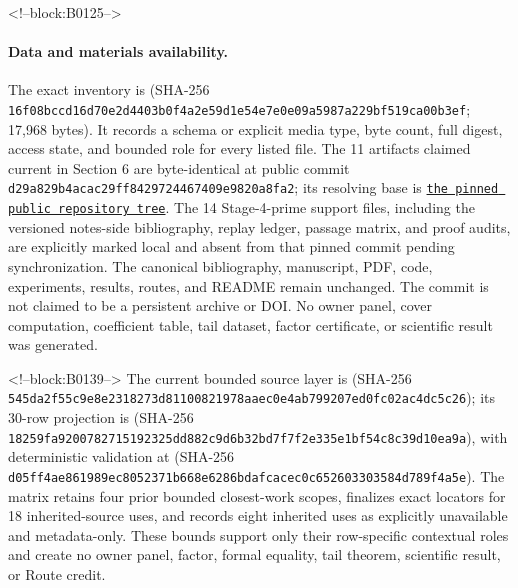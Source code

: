 \documentclass[11pt]{article}
\begin{document}
<!--block:B0125-->
\paragraph{Data and materials availability.}\begingroup\sloppy
The exact inventory is
 (SHA-256
\texttt{16f08bcc\allowbreak{}d16d70e2\allowbreak{}d4403b0f\allowbreak{}4a2e59d1\allowbreak{}e54e7e0e\allowbreak{}09a5987a\allowbreak{}229bf519\allowbreak{}ca00b3ef}; 17,968 bytes).  It records a schema or explicit media type,
byte count, full digest, access state, and bounded role for every listed file.
The 11 artifacts claimed current in Section 6 are byte-identical at public
commit \texttt{d29a829b\allowbreak{}4acac29f\allowbreak{}f8429724\allowbreak{}467409e9\allowbreak{}820a8fa2}; its resolving base is
\href{https://github.com/maris205/hilbert-polya-structure/tree/d29a829b4acac29ff8429724467409e9820a8fa2/flow_systems/papers/32-homology-cover-renormalization-uniformity}{\texttt{the pinned public repository tree}}.
The 14 Stage-4-prime support files, including the versioned notes-side
bibliography, replay ledger, passage matrix, and proof audits, are explicitly
marked local and absent from that pinned commit pending synchronization.  The
canonical bibliography, manuscript, PDF, code, experiments, results, routes,
and README remain unchanged.  The commit is not claimed to be a persistent
archive or DOI.  No owner panel, cover computation, coefficient table, tail
dataset, factor certificate, or scientific result was generated.

<!--block:B0139-->
The current bounded source layer is
 (SHA-256
\texttt{545da2f5\allowbreak{}5c9e8e23\allowbreak{}18273d81\allowbreak{}10082197\allowbreak{}8aaec0e4\allowbreak{}ab799207\allowbreak{}ed0fc02a\allowbreak{}c4dc5c26}); its 30-row projection is
 (SHA-256
\texttt{18259fa9\allowbreak{}20078271\allowbreak{}5192325d\allowbreak{}d882c9d6\allowbreak{}b32bd7f7\allowbreak{}f2e335e1\allowbreak{}bf54c8c3\allowbreak{}9d10ea9a}), with deterministic validation at
 (SHA-256
\texttt{d05ff4ae\allowbreak{}861989ec\allowbreak{}8052371b\allowbreak{}668e6286\allowbreak{}bdafcace\allowbreak{}c0c65260\allowbreak{}3303584d\allowbreak{}789f4a5e}).  The matrix retains four prior bounded
closest-work scopes, finalizes exact locators for 18 inherited-source uses, and
records eight inherited uses as explicitly unavailable and metadata-only. These
bounds support only their row-specific contextual roles and create no owner panel,
factor, formal equality, tail theorem, scientific result, or Route credit.
\par\endgroup
\end{document}
